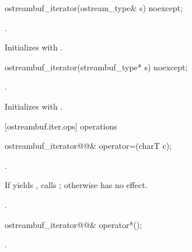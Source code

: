 %
\begin{itemdecl}
ostreambuf_iterator(ostream_type& s) noexcept;
\end{itemdecl}

\begin{itemdescr}
\pnum
\requires
{}
.
\end{itemdescr}

\begin{itemdescr}
\pnum
\effects
Initializes  with .
\end{itemdescr}

%
\begin{itemdecl}
ostreambuf_iterator(streambuf_type* s) noexcept;
\end{itemdecl}

\begin{itemdescr}
\pnum
\requires
{}
.

\pnum
\effects
Initializes  with .
\end{itemdescr}

[ostreambuf.iter.ops]{ operations}

%
\begin{itemdecl}
ostreambuf_iterator@@&
  operator=(charT c);
\end{itemdecl}

\begin{itemdescr}
\begin{addedblock}
\pnum
\requires {}.
\end{addedblock}

\pnum
\effects
If
yields
,
calls
;
otherwise has no effect.

\pnum
\returns
{}.
\end{itemdescr}

%
\begin{itemdecl}
ostreambuf_iterator@@& operator*();
\end{itemdecl}

\begin{itemdescr}
\pnum
\returns
{}.
\end{itemdescr}

